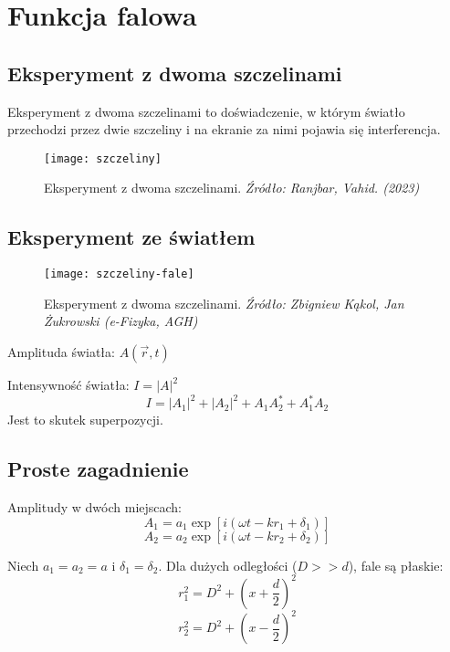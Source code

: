 \section{Funkcja falowa}

\subsection{Eksperyment z dwoma szczelinami}
Eksperyment z dwoma szczelinami to doświadczenie, w którym światło przechodzi przez dwie szczeliny i na ekranie za nimi pojawia się interferencja.

\begin{figure}[H]
    \centering
    \texttt{[image: szczeliny]}
    \caption{Eksperyment z dwoma szczelinami. \textit{Źródło: Ranjbar, Vahid. (2023)}}
    \label{fig:szczeliny}
\end{figure}

\subsection{Eksperyment ze światłem}

\begin{figure}[H]
    \centering
    \texttt{[image: szczeliny-fale]}
    \caption{Eksperyment z dwoma szczelinami. \textit{Źródło: Zbigniew Kąkol, Jan Żukrowski (e-Fizyka, AGH)}}
    \label{fig:szczeliny-fale}
\end{figure}

Amplituda światła: $A(\vec{r}, t)$

Intensywność światła: $I = |A|^2$
\begin{equation*}
    I = |A_1|^2 + |A_2|^2 + A_1 A_2^* + A_1^* A_2
\end{equation*}
Jest to skutek superpozycji.

\subsection{Proste zagadnienie}

Amplitudy w dwóch miejscach:
\begin{equation*}
    A_1 = a_1 \exp[i(\omega t - k r_1 + \delta_1)]
\end{equation*}
\begin{equation*}
    A_2 = a_2 \exp[i(\omega t - k r_2 + \delta_2)]
\end{equation*}

Niech $a_1 = a_2 = a$ i $\delta_1 = \delta_2$. Dla dużych odległości ($D >> d$), fale są płaskie:
\begin{equation*}
    r_1^2 = D^2 + \left(x + \frac{d}{2} \right)^2
\end{equation*}
\begin{equation*}
    r_2^2 = D^2 + \left(x - \frac{d}{2} \right)^2
\end{equation*}

